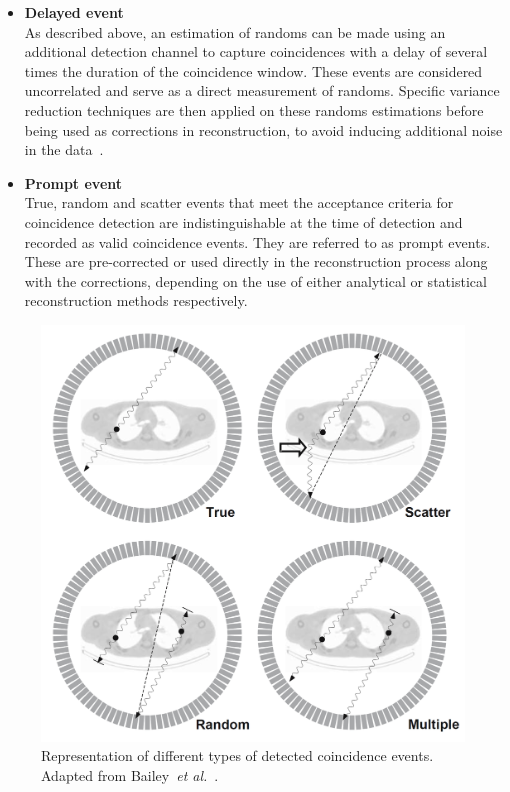 \begin{itemize}
%
\item\textbf{Delayed event}\\
As described above, an estimation of randoms can be made using an additional detection channel to capture coincidences with a delay of several times the duration of the coincidence window. These events are considered uncorrelated and serve as a direct measurement of randoms. Specific variance reduction techniques are then applied on these randoms estimations before being used as corrections in reconstruction, to avoid inducing additional noise in the data~\cite{Bailey2005}.
%
\item\textbf{Prompt event}\\
True, random and scatter events that meet the acceptance criteria for coincidence detection are indistinguishable at the time of detection and recorded as valid coincidence events. They are referred to as prompt events.
These are pre-corrected or used directly in the reconstruction process along with the corrections, depending on the use of either analytical or statistical reconstruction methods respectively.
\end{itemize}
%
\begin{figure} [h!]
\centering
\includegraphics[scale=0.22,angle=0]{2_Theory_Methods/figures/Bailey_Scatter_Random_events.png}
\caption{Representation of different types of detected coincidence events. Adapted from Bailey~\textit{et al.}~\cite{Bailey2005}.} 
\label{fig_2:EventsIlustration}
\end{figure} 
%
%

